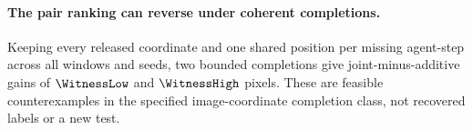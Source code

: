 \paragraph{The pair ranking can reverse under coherent completions.}
Keeping every released coordinate and one shared position
per missing agent-step across all windows and seeds, two
bounded completions give joint-minus-additive gains of
$\WitnessLow$ and $\WitnessHigh$ pixels. These are feasible
counterexamples in the specified image-coordinate
completion class, not recovered labels or a new test.
